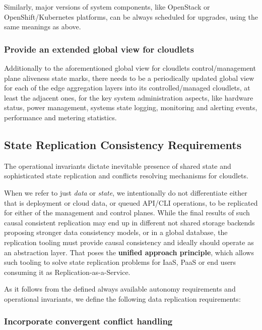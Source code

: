 \documentclass[conference]{IEEEtran}
\begin{document}
Similarly, major versions of system components, like OpenStack or
OpenShift/Kubernetes platforms, can be always scheduled for upgrades, using the
same meanings as above.

\subsubsection{Provide an extended global view for cloudlets}

Additionally to the aforementioned global view for cloudlets control/management
plane aliveness state marks, there needs to be a periodically updated global
view for each of the edge aggregation layers into its controlled/managed
cloudlets, at least the adjacent ones, for the key system administration
aspects, like hardware status, power management, systems state logging,
monitoring and alerting events, performance and metering statistics.

\subsection{State Replication Consistency Requirements}

The operational invariants dictate inevitable presence of shared state and
sophisticated state replication and conflicts resolving
mechanisms for cloudlets.

When we refer to just \textit{data} or \textit{state}, we intentionally do not
differentiate either that is deployment or cloud data, or queued API/CLI
operations, to be replicated for either of the management and control planes.
While the final results of such causal consistent replication may end up in
different not shared storage backends proposing stronger data consistency
models, or in a global database, the replication tooling must provide causal
consistency and ideally should operate as an abstraction layer. That poses the
\textbf{unified approach principle}, which allows such tooling to solve state
replication problems for IaaS, PaaS or end users consuming it as
Replication-as-a-Service.

As it follows from the defined always available autonomy requirements and
operational invariants, we define the following data replication requirements:

\subsubsection{Incorporate convergent conflict handling\cite{b1}}
\end{document}
